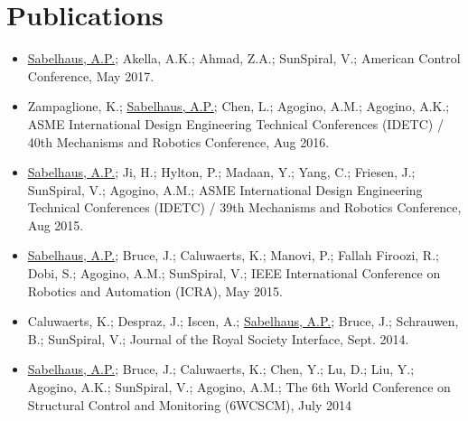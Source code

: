 \documentclass[letterpaper]{deedy-resume} %
\begin{document}

  
\section{Publications}



\begin{itemize}

\item {} \underline{Sabelhaus, A.P.}; Akella, A.K.; Ahmad, Z.A.; SunSpiral, V.; American Control Conference, May 2017.
  
\item {} Zampaglione, K.; \underline{Sabelhaus, A.P.};  Chen, L.;  Agogino, A.M.;  Agogino, A.K.;  ASME International Design Engineering Technical Conferences (IDETC) / 40th Mechanisms and Robotics Conference, Aug 2016.
  
\item {} \underline{Sabelhaus, A.P.}; Ji, H.; Hylton, P.; Madaan, Y.; Yang, C.; Friesen, J.; SunSpiral, V.; Agogino, A.M.; ASME International Design Engineering Technical Conferences (IDETC) / 39th Mechanisms and Robotics Conference, Aug 2015.

\item {} \underline{Sabelhaus, A.P.}; Bruce, J.; Caluwaerts, K.; Manovi, P.; Fallah Firoozi, R.; Dobi, S.; Agogino, A.M.; SunSpiral, V.; IEEE International Conference on Robotics and Automation (ICRA), May 2015.

\item {} Caluwaerts, K.; Despraz, J.; Iscen, A.; \underline{Sabelhaus, A.P.}; Bruce, J.; Schrauwen, B.; SunSpiral, V.;  Journal of the Royal Society Interface, Sept. 2014.

\item {} \underline{Sabelhaus, A.P.}; Bruce, J.; Caluwaerts, K.; Chen, Y.; Lu, D.; Liu, Y.; Agogino, A.K.; SunSpiral, V.; Agogino, A.M.; The 6th World Conference on Structural Control and Monitoring (6WCSCM), July 2014


\end{itemize}
\end{document}
